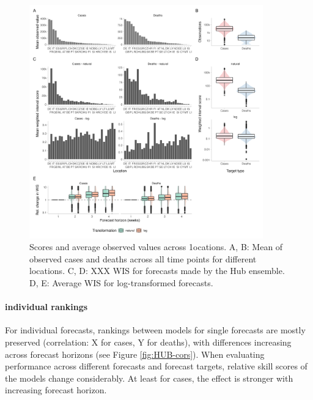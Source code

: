 \documentclass{article}
\begin{document}
\begin{figure}[h!]
    \centering
    \includegraphics[width=0.9\textwidth]{output/figures/HUB-mean-obs-location.png}
    \caption{Scores and average observed values across 1ocations. A, B: Mean of observed cases and deaths across all time points for different locations. C, D: XXX WIS for forecasts made by the Hub ensemble. D, E: Average WIS for log-transformed forecasts. }
    \label{fig:HUB-mean-locations}
\end{figure}

\paragraph{individual rankings}
For individual forecasts, rankings between models for single forecasts are mostly preserved (correlation: X for cases, Y for deaths), with differences increasing across forecast horizons (see Figure \ref{fig:HUB-cors}). When evaluating performance across different forecasts and forecast targets, relative skill scores of the models change considerably. At least for cases, the effect is stronger with increasing forecast horizon. 
\end{document}
